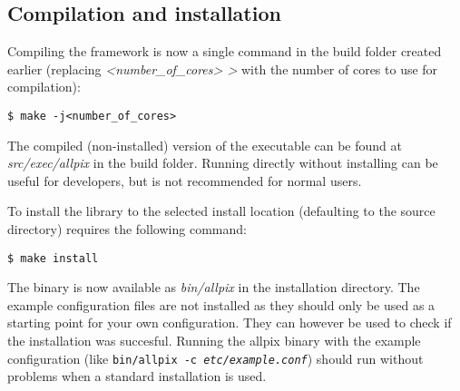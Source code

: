 \subsection{Compilation and installation}
Compiling the framework is now a single command in the build folder created earlier (replacing \textit{\textless number\_of\_cores> \textgreater} with the number of cores to use for compilation):
\begin{verbatim}
$ make -j<number_of_cores>
\end{verbatim}
The compiled (non-installed) version of the executable can be found at \textit{src/exec/allpix} in the build folder. Running \apsq directly without installing can be useful for developers, but is not recommended for normal users.

To install the library to the selected install location (defaulting to the source directory) requires the following command:
\begin{verbatim}
$ make install
\end{verbatim}

The binary is now available as \textit{bin/allpix} in the installation directory. The example configuration files are not installed as they should only be used as a starting point for your own configuration. They can however be used to check if the installation was succesful. Running the allpix binary with the example configuration (like \texttt{bin/allpix -c \textit{etc/example.conf}}) should run without problems when a standard installation is used.
